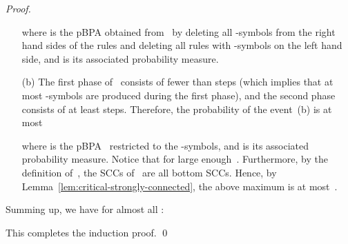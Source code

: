\begin{proof}
\begin{itemize}
   where  is the pBPA obtained from~ by deleting all -symbols
   from the right hand sides of the rules and deleting all rules with -symbols on the left hand side,
   and  is its associated probability measure.
  \item[(b)]
   The first phase of~ consists of fewer than  steps
    (which implies that at most  -symbols are produced during the first phase),
    and the second phase consists of at least  steps.
   Therefore, the probability of the event~(b) is at most
    
    where  is the pBPA~ restricted to the -symbols,
     and  is its associated probability measure.
   Notice that  for large enough~.
   Furthermore, by the definition of~, the SCCs of~ are all bottom SCCs.
   Hence, by Lemma~\ref{lem:critical-strongly-connected}, the above maximum is at most~.
 \end{itemize}
 Summing up, we have for almost all :
 
 This completes the induction proof.
\qed
\end{proof}
